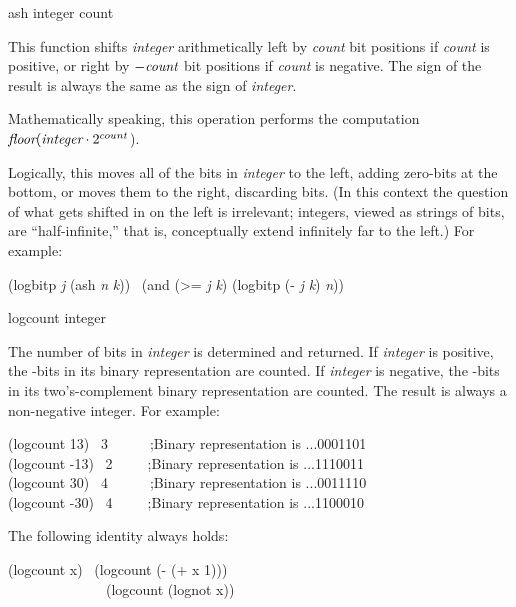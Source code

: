 \begin{defun}[Function]
ash integer count

This function shifts \emph{integer} arithmetically left by \emph{count} bit
positions if \emph{count} is positive,
or right by $-\emph{count}$ bit positions if \emph{count} is negative.
The sign of the result is always the same as the sign of \emph{integer}.

Mathematically speaking, this operation performs the computation
$\emph{floor}(\emph{integer}\cdot2^{count}$).

Logically, this moves all of the bits in \emph{integer} to the left,
adding zero-bits at the bottom, or moves them to the right,
discarding bits.  (In this context the question of what gets shifted
in on the left is irrelevant; integers, viewed as strings of bits,
are ``half-infinite,'' that is, conceptually extend infinitely far to the left.)
For example:
\begin{lisp}
(logbitp \emph{j} (ash \emph{n} \emph{k})) \EQ\ (and (>= \emph{j} \emph{k}) (logbitp (- \emph{j} \emph{k}) \emph{n}))
\end{lisp}
\end{defun}

\begin{defun}[Function]
logcount integer

The number of bits in \emph{integer} is determined and returned.
If \emph{integer} is positive, the -bits in its binary
representation are counted.  If \emph{integer} is negative,
the -bits in its two's-complement binary representation are counted.
The result is always a non-negative integer.
For example:
\begin{lisp}
(logcount 13) \EV\ 3~~~~~~;\textrm{Binary representation is} ...0001101 \\
(logcount -13) \EV\ 2~~~~~;\textrm{Binary representation is} ...1110011 \\
(logcount 30) \EV\ 4~~~~~~;\textrm{Binary representation is} ...0011110 \\
(logcount -30) \EV\ 4~~~~~;\textrm{Binary representation is} ...1100010
\end{lisp}
The following identity always holds:
\begin{lisp}
(logcount x) \EQ\ (logcount (- (+ x 1))) \\
~~~~~~~~~~~~~\EQ\ (logcount (lognot x))
\end{lisp}
\end{defun}

